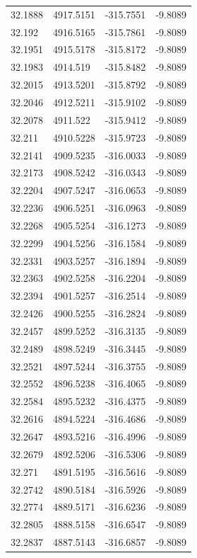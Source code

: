 \begin{table}[H]
\begin{tabular}{llll}
32.1888 & 4917.5151 & -315.7551 & -9.8089 \\
32.192 & 4916.5165 & -315.7861 & -9.8089 \\
32.1951 & 4915.5178 & -315.8172 & -9.8089 \\
32.1983 & 4914.519 & -315.8482 & -9.8089 \\
32.2015 & 4913.5201 & -315.8792 & -9.8089 \\
32.2046 & 4912.5211 & -315.9102 & -9.8089 \\
32.2078 & 4911.522 & -315.9412 & -9.8089 \\
32.211 & 4910.5228 & -315.9723 & -9.8089 \\
32.2141 & 4909.5235 & -316.0033 & -9.8089 \\
32.2173 & 4908.5242 & -316.0343 & -9.8089 \\
32.2204 & 4907.5247 & -316.0653 & -9.8089 \\
32.2236 & 4906.5251 & -316.0963 & -9.8089 \\
32.2268 & 4905.5254 & -316.1273 & -9.8089 \\
32.2299 & 4904.5256 & -316.1584 & -9.8089 \\
32.2331 & 4903.5257 & -316.1894 & -9.8089 \\
32.2363 & 4902.5258 & -316.2204 & -9.8089 \\
32.2394 & 4901.5257 & -316.2514 & -9.8089 \\
32.2426 & 4900.5255 & -316.2824 & -9.8089 \\
32.2457 & 4899.5252 & -316.3135 & -9.8089 \\
32.2489 & 4898.5249 & -316.3445 & -9.8089 \\
32.2521 & 4897.5244 & -316.3755 & -9.8089 \\
32.2552 & 4896.5238 & -316.4065 & -9.8089 \\
32.2584 & 4895.5232 & -316.4375 & -9.8089 \\
32.2616 & 4894.5224 & -316.4686 & -9.8089 \\
32.2647 & 4893.5216 & -316.4996 & -9.8089 \\
32.2679 & 4892.5206 & -316.5306 & -9.8089 \\
32.271 & 4891.5195 & -316.5616 & -9.8089 \\
32.2742 & 4890.5184 & -316.5926 & -9.8089 \\
32.2774 & 4889.5171 & -316.6236 & -9.8089 \\
32.2805 & 4888.5158 & -316.6547 & -9.8089 \\
32.2837 & 4887.5143 & -316.6857 & -9.8089 \\

\end{tabular}
\end{table}
